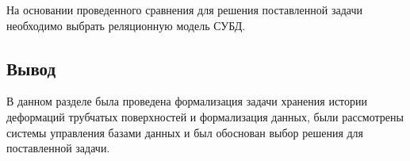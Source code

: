 \noindent
\hspace{1.25cm}
На основании проведенного сравнения для решения поставленной задачи необходимо выбрать реляционную модель СУБД.


\subsection{Вывод}

\noindent
\hspace{1.25cm}
В данном разделе была проведена формализация задачи хранения истории деформаций трубчатых поверхностей и формализация данных, были рассмотрены системы управления базами данных и был обоснован выбор решения для поставленной задачи.

\newpage